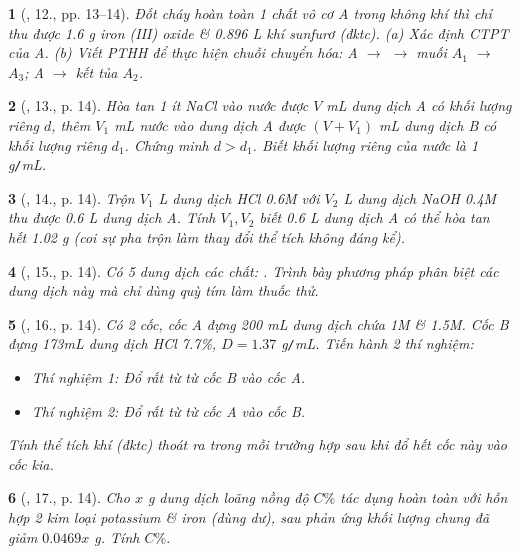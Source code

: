 \documentclass{article}
\newtheorem{baitoan}{}
\begin{document}
\begin{baitoan}[\cite{An_400_BT_Hoa_Hoc_9}, 12., pp. 13--14]
	Đốt cháy hoàn toàn 1 chất vô cơ A trong không khí thì chỉ thu được {\rm1.6 g} iron (III) oxide \& {\rm0.896 L} khí sunfurơ (đktc). (a) Xác định {\rm CTPT} của A. (b) Viết {\rm PTHH} để thực hiện chuỗi chuyển hóa: A $\to$ {\rm {}} $\to$ muối $A_1$ $\to$ $A_3$; A $\to$ kết tủa $A_2$.
\end{baitoan}

\begin{baitoan}[\cite{An_400_BT_Hoa_Hoc_9}, 13., p. 14]
	Hòa tan 1 ít {\rm NaCl} vào nước được $V$ {\rm mL} dung dịch A có khối lượng riêng $d$, thêm $V_1$ {\rm mL} nước vào dung dịch A được $(V + V_1)$ mL dung dịch B có khối lượng riêng $d_1$. Chứng minh $d > d_1$. Biết khối lượng riêng của nước là {\rm1 g{\tt/}mL}.
\end{baitoan}

\begin{baitoan}[\cite{An_400_BT_Hoa_Hoc_9}, 14., p. 14]
	Trộn $V_1$ {\rm L} dung dịch {\rm HCl 0.6M} với $V_2$ {\rm L} dung dịch {\rm NaOH 0.4M} thu được {\rm0.6 L} dung dịch A. Tính $V_1,V_2$ biết {\rm0.6 L} dung dịch A có thể hòa tan hết {\rm1.02 g } (coi sự pha trộn làm thay đổi thể tích không đáng kể).
\end{baitoan}

\begin{baitoan}[\cite{An_400_BT_Hoa_Hoc_9}, 15., p. 14]
	Có 5 dung dịch các chất: {\rm{}}. Trình bày phương pháp phân biệt các dung dịch này mà chỉ dùng quỳ tím làm thuốc thử.
\end{baitoan}

\begin{baitoan}[\cite{An_400_BT_Hoa_Hoc_9}, 16., p. 14]
	Có 2 cốc, cốc A đựng {\rm200 mL} dung dịch chứa {\rm{} 1M} \& {\rm{} 1.5M}. Cốc B đựng {\rm173mL} dung dịch {\rm HCl 7.7\%}, $D = 1.37$ {\rm g{\tt/}mL}. Tiến hành 2 thí nghiệm:
	\begin{itemize}
		\item Thí nghiệm 1: Đổ rất từ từ cốc B vào cốc A.
		\item Thí nghiệm 2: Đổ rất từ từ cốc A vào cốc B.
	\end{itemize}
	Tính thể tích khí (đktc) thoát ra trong mỗi trường hợp sau khi đổ hết cốc này vào cốc kia.
\end{baitoan}

\begin{baitoan}[\cite{An_400_BT_Hoa_Hoc_9}, 17., p. 14]
	Cho $x$ {\rm g} dung dịch {\rm{}} loãng nồng độ $C\%$ tác dụng hoàn toàn với hỗn hợp 2 kim loại potassium \& iron (dùng dư), sau phản ứng khối lượng chung đã giảm $0.0469x$ {\rm g}. Tính $C\%$.
\end{baitoan}
\end{document}
